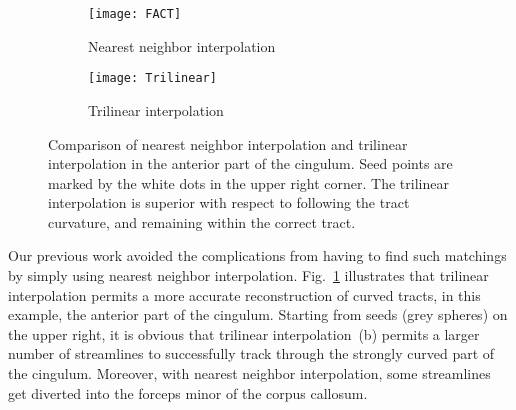 \begin{figure}
	\centering
	\begin{subfigure}[b]{0.45\linewidth}
		\texttt{[image: FACT]}
		\caption{Nearest neighbor interpolation}
	\end{subfigure}
	\begin{subfigure}[b]{0.45\linewidth}
		\texttt{[image: Trilinear]}
		\caption{Trilinear interpolation}
	\end{subfigure}
	\caption{Comparison of nearest neighbor interpolation and trilinear
	interpolation in the anterior part of the cingulum. Seed points are marked
	by the white dots in the upper right corner. The trilinear interpolation
        is superior with respect to following the tract curvature, and remaining within the correct tract.}

	\label{fig:interpolation-comparison}
\end{figure}

Our previous work \cite{Gruen:2021} avoided the complications from having to find such matchings by simply using nearest neighbor interpolation. Fig.~\ref{fig:interpolation-comparison} illustrates that trilinear interpolation permits a more accurate reconstruction of curved tracts, in this example, the anterior part of the cingulum. Starting from seeds (grey spheres) on the upper right, it is obvious that trilinear interpolation~(b) permits a larger number of streamlines to successfully track through the strongly curved part of the cingulum. Moreover, with nearest neighbor interpolation, some streamlines get diverted into the forceps minor of the corpus callosum.



